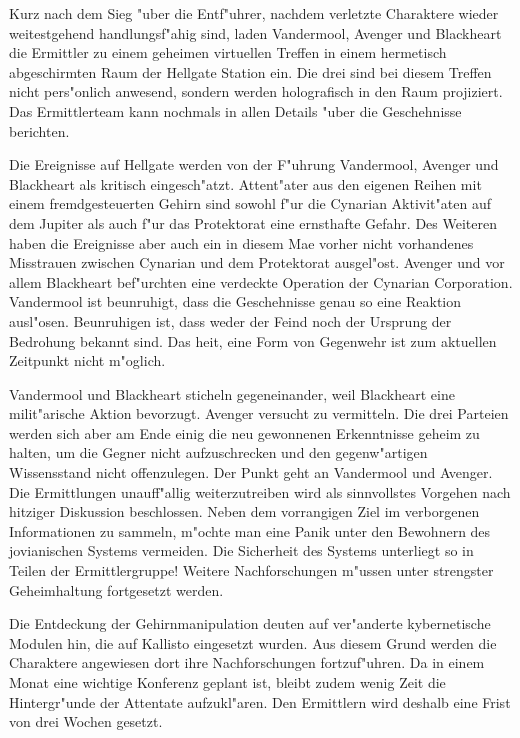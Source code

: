 
Kurz nach dem Sieg "uber die Entf"uhrer, nachdem verletzte Charaktere wieder weitestgehend handlungsf"ahig sind, laden Vandermool, Avenger und Blackheart die Ermittler zu einem geheimen virtuellen Treffen in einem hermetisch abgeschirmten Raum der Hellgate Station ein. Die drei sind bei diesem Treffen nicht pers"onlich anwesend, sondern werden holografisch in den Raum projiziert. Das Ermittlerteam kann nochmals in allen Details "uber die Geschehnisse berichten. 

Die Ereignisse auf Hellgate werden von der F"uhrung Vandermool, Avenger und Blackheart als kritisch eingesch"atzt. Attent"ater aus den eigenen Reihen mit einem fremdgesteuerten Gehirn sind sowohl f"ur die Cynarian Aktivit"aten auf dem Jupiter als auch f"ur das Protektorat eine ernsthafte Gefahr. Des Weiteren haben die Ereignisse aber auch ein in diesem Ma\3e vorher nicht vorhandenes Misstrauen zwischen Cynarian und dem Protektorat ausgel"ost. Avenger und vor allem Blackheart bef"urchten eine verdeckte Operation der Cynarian Corporation. Vandermool ist beunruhigt, dass die Geschehnisse genau so eine Reaktion ausl"osen. Beunruhigen ist, dass weder der Feind noch der Ursprung der Bedrohung bekannt sind. Das hei\3t, eine Form von Gegenwehr ist zum aktuellen Zeitpunkt nicht m"oglich.

Vandermool und Blackheart sticheln gegeneinander, weil Blackheart eine milit"arische Aktion bevorzugt. Avenger versucht zu vermitteln. Die drei Parteien werden sich aber am Ende einig die neu gewonnenen Erkenntnisse geheim zu halten, um die Gegner nicht aufzuschrecken und den gegenw"artigen Wissensstand nicht offenzulegen. Der Punkt geht an Vandermool und Avenger. Die Ermittlungen unauff"allig weiterzutreiben wird als sinnvollstes Vorgehen nach hitziger Diskussion beschlossen. Neben dem vorrangigen Ziel im verborgenen Informationen zu sammeln, m"ochte man eine Panik unter den Bewohnern des jovianischen Systems vermeiden. Die Sicherheit des Systems unterliegt so in Teilen der Ermittlergruppe! Weitere Nachforschungen m"ussen unter strengster Geheimhaltung fortgesetzt werden. 

Die Entdeckung der Gehirnmanipulation deuten auf ver"anderte kybernetische Modulen hin, die auf Kallisto eingesetzt wurden. Aus diesem Grund werden die Charaktere angewiesen dort ihre Nachforschungen fortzuf"uhren. Da in einem Monat eine wichtige Konferenz geplant ist, bleibt zudem wenig Zeit die Hintergr"unde der Attentate aufzukl"aren. Den Ermittlern wird deshalb eine Frist von drei Wochen gesetzt. 


